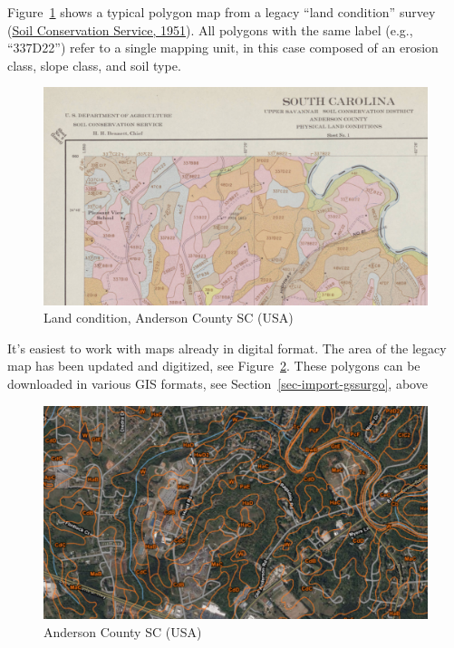 \documentclass[
  letterpaper,
  DIV=11,
  numbers=noendperiod]{scrartcl}
\begin{document}
Figure~\ref{fig-anderson} shows a typical polygon map from a legacy
``land condition'' survey
(\protect\hyperlink{ref-soilconservationservicePhysicalLandConditions1951}{Soil
Conservation Service, 1951}). All polygons with the same label (e.g.,
``337D22'') refer to a single mapping unit, in this case composed of an
erosion class, slope class, and soil type.

\begin{figure}

{\centering \includegraphics{./figs/UpperSavannahSCD_Sheet4_colour_NWcorner.png}

}

\caption{\label{fig-anderson}Land condition, Anderson County SC (USA)}

\end{figure}

It's easiest to work with maps already in digital format. The area of
the legacy map has been updated and digitized, see
Figure~\ref{fig-anderson-wss}. These polygons can be downloaded in
various GIS formats, see Section~\ref{sec-import-gssurgo}, above

\begin{figure}

{\centering \includegraphics{./figs/WebSoilSurvey_AndersonCountyNW.png}

}

\caption{\label{fig-anderson-wss}Anderson County SC (USA)}

\end{figure}
\end{document}
